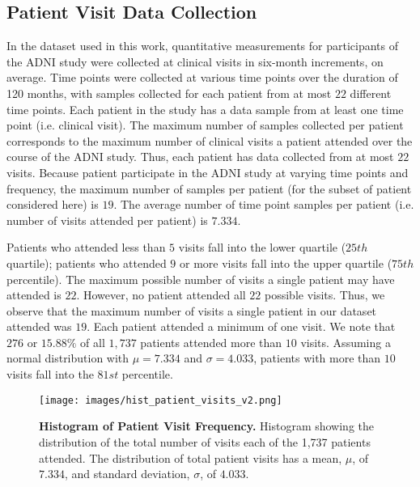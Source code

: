 \documentclass{article}
\begin{document}
\subsection{Patient Visit Data Collection}

In the dataset used in this work, quantitative measurements for participants of the ADNI study were collected at clinical visits in six-month increments, on average. Time points were collected at various time points over the duration of 120 months, with samples collected for each patient from at most $22$ different time points. Each patient in the study has a data sample from at least one time point (i.e. clinical visit). The maximum number of samples collected per patient corresponds to the maximum number of clinical visits a patient attended over the course of the ADNI study. Thus, each patient has data collected from at most $22$ visits. Because patient participate in the ADNI study at varying time points and frequency, the maximum number of samples per patient (for the subset of patient considered here) is $19$. The average number of time point samples per patient (i.e. number of visits attended per patient) is $7.334$.

Patients who attended less than $5$ visits fall into the lower quartile ($25th$ quartile); patients who attended $9$ or more visits fall into the upper quartile ($75th$ percentile). The maximum possible number of visits a single patient may have attended is $22$. However, no patient attended all $22$ possible visits. Thus, we observe that the maximum number of visits a single patient in our dataset attended was $19$. Each patient attended a minimum of one visit. We note that $276$ or $15.88\%$ of all $1,737$ patients attended more than $10$ visits. Assuming a normal distribution with $\mu = 7.334$ and $\sigma = 4.033$, patients with more than $10$ visits fall into the $81st$ percentile. 

\begin{figure}[t]
\centering
\texttt{[image: images/hist\_patient\_visits\_v2.png]}
\caption{{\small {\bf Histogram of Patient Visit Frequency.} Histogram showing the distribution of the total number of visits each of the 1,737 patients attended. The distribution of total patient visits has a mean, $\mu$, of $7.334$, and standard deviation, $\sigma$, of $4.033$. %
}}
\label{visit_hist}
\end{figure}
\end{document}
